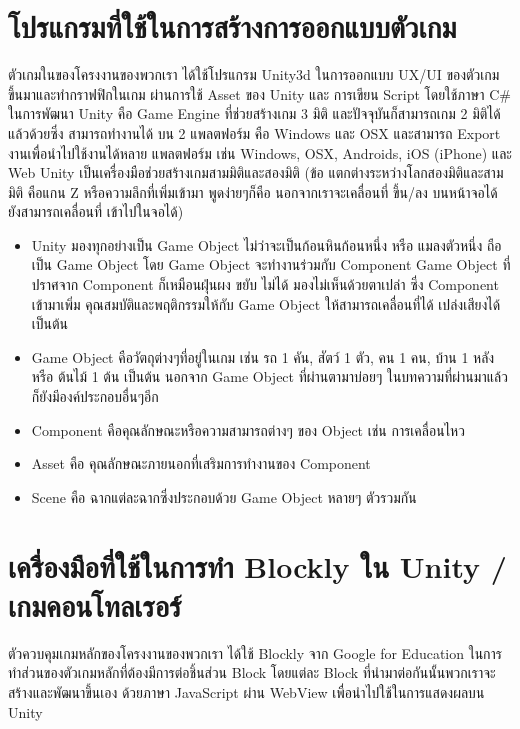 \section{โปรแกรมที่ใช้ในการสร้างการออกแบบตัวเกม}
ตัวเกมในของโครงงานของพวกเรา ได้ใช้โปรแกรม Unity3d
ในการออกแบบ UX/UI ของตัวเกมขึ้นมาและทำกราฟฟิกในเกม 
ผ่านการใช้ Asset ของ Unity และ การเขียน Script 
โดยใช้ภาษา C\# ในการพัฒนา\newline
Unity คือ Game Engine ที่ช่วยสร้างเกม 3 มิติ 
และปัจจุบันก็สามารถเกม 2 มิติได้แล้วด้วยซึ่ง 
สามารถทำงานได้ บน 2 แพลตฟอร์ม คือ Windows และ OSX 
และสามารถ Export งานเพื่อนำไปใช้งานได้หลาย แพลตฟอร์ม 
เช่น Windows, OSX, Androids, iOS (iPhone) และ Web\newline
Unity เป็นเครื่องมือช่วยสร้างเกมสามมิติและสองมิติ 
(ข้อ แตกต่างระหว่างโลกสองมิติและสามมิติ คือแกน Z หรือความลึกที่เพิ่มเข้ามา 
พูดง่ายๆก็คือ นอกจากเราจะเคลื่อนที่ ขึ้น/ลง บนหน้าจอได้ ยังสามารถเคลื่อนที่ 
เข้าไปในจอได้)~\cite{unth}
\begin{itemize}
  \item Unity มองทุกอย่างเป็น Game Object ไม่ว่าจะเป็นก้อนหินก้อนหนึ่ง 
  หรือ แมลงตัวหนึ่ง ถือเป็น Game Object โดย Game Object 
  จะทำงานร่วมกับ Component Game Object ที่ปราศจาก Component 
  ก็เหมือนฝุ่นผง ขยับ ไม่ได้ มองไม่เห็นด้วยตาเปล่า ซึ่ง Component 
  เข้ามาเพิ่ม คุณสมบัติและพฤติกรรมให้กับ Game Object ให้สามารถเคลื่อนที่ได้ 
  เปล่งเสียงได้ เป็นต้น
  \item Game Object คือวัตถุต่างๆที่อยู่ในเกม 
  เช่น รถ 1 คัน, สัตว์ 1 ตัว, คน 1 คน, บ้าน 1 หลัง หรือ ต้นไม้ 1 ต้น เป็นต้น 
  นอกจาก Game Object ที่ผ่านตามาบ่อยๆ ในบทความที่ผ่านมาแล้ว 
  ก็ยังมีองค์ประกอบอื่นๆอีก
  \item Component คือคุณลักษณะหรือความสามารถต่างๆ ของ Object เช่น การเคลื่อนไหว
  \item Asset คือ คุณลักษณะภายนอกที่เสริมการทำงานของ Component
  \item Scene คือ ฉากแต่ละฉากซึ่งประกอบด้วย Game Object หลายๆ ตัวรวมกัน
\end{itemize}

\section{เครื่องมือที่ใช้ในการทำ Blockly ใน Unity / เกมคอนโทลเรอร์}
ตัวควบคุมเกมหลักของโครงงานของพวกเรา ได้ใช้ Blockly 
จาก Google for Education ในการทำส่วนของตัวเกมหลักที่ต้องมีการต่อชิ้นส่วน 
Block โดยแต่ละ Block ที่นำมาต่อกันนั้นพวกเราจะสร้างและพัฒนาขึ้นเอง ด้วยภาษา 
JavaScript ผ่าน WebView เพื่อนำไปใช้ในการแสดงผลบน Unity
